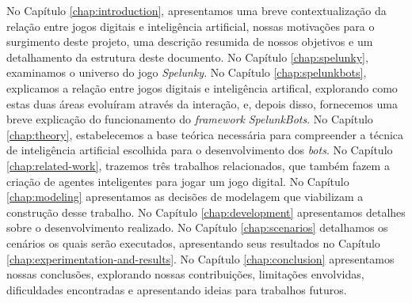 No Capítulo \ref{chap:introduction}, apresentamos uma breve contextualização da
relação entre jogos digitais e inteligência artificial, nossas motivações para
o surgimento deste projeto, uma descrição resumida de nossos objetivos e um
detalhamento da estrutura deste documento. No Capítulo \ref{chap:spelunky},
examinamos o universo do jogo \textit{Spelunky}. No Capítulo
\ref{chap:spelunkbots}, explicamos a relação entre jogos digitais e
inteligência artifical, explorando como estas duas áreas evoluíram através da
interação, e, depois disso, fornecemos uma breve explicação do funcionamento do
\textit{framework} \textit{SpelunkBots}. No Capítulo \ref{chap:theory},
estabelecemos a base teórica necessária para compreender a técnica de
inteligência artificial escolhida para o desenvolvimento dos \textit{bots}. No
Capítulo \ref{chap:related-work}, trazemos três trabalhos relacionados, que
também fazem a criação de agentes inteligentes para jogar um jogo digital. No
Capítulo \ref{chap:modeling} apresentamos as decisões de modelagem que
viabilizam a construção desse trabalho. No Capítulo \ref{chap:development}
apresentamos detalhes sobre o desenvolvimento realizado.  No Capítulo
\ref{chap:scenarios} detalhamos os cenários os quais serão executados,
apresentando seus resultados no Capítulo
\ref{chap:experimentation-and-results}. No Capítulo \ref{chap:conclusion}
apresentamos nossas conclusões, explorando nossas contribuições, limitações
envolvidas, dificuldades encontradas e apresentando ideias para trabalhos
futuros.

